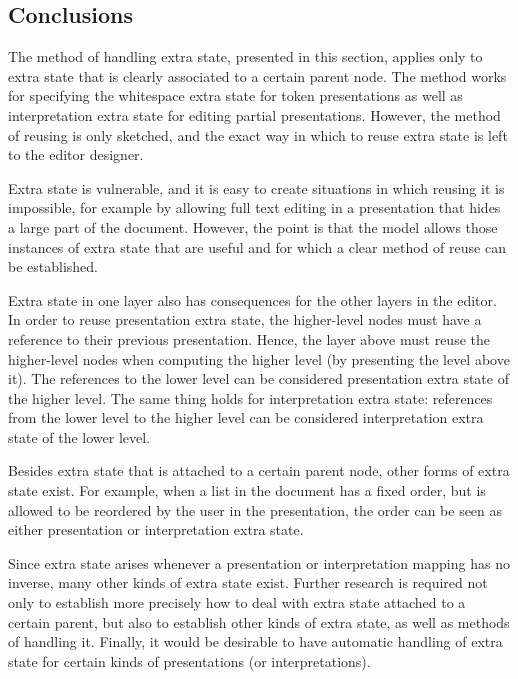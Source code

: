 \subsection{Conclusions}

The method of handling extra state, presented in this section, applies only to extra state that is clearly associated to a certain parent node. The method works for specifying the whitespace extra state for token presentations as well as interpretation extra state for editing partial presentations. However, the method of reusing is only sketched, and the exact way in which to reuse extra state is left to the editor designer.

Extra state is vulnerable, and it is easy to create situations in which reusing it is impossible, for example by allowing full text editing in a presentation that hides a large part of the document. However, the point is that the model allows those instances of extra state that are useful and for which a clear method of reuse can be established.

Extra state in one layer also has consequences for the other layers in the editor. In order to reuse presentation extra state, the higher-level nodes must have a reference to their previous presentation. Hence, the layer above must reuse the higher-level nodes when computing the higher level (by presenting the level above it). The references to the lower level can be considered presentation extra state of the higher level. The same thing holds for interpretation extra state: references from the lower level to the higher level can be considered interpretation extra state of the lower level.

Besides extra state that is attached to a certain parent node, other forms of extra state exist. For example, when a list in the document has a fixed order, but is allowed to be reordered by the user in the presentation, the order can be seen as either presentation or interpretation extra state.


Since extra state arises whenever a presentation or interpretation mapping has no inverse, many other kinds of extra state exist.
Further research is required not only to establish more precisely how to deal with extra state attached to a certain parent, but also to establish other kinds of extra state, as well as methods of handling it. Finally, it would be desirable to have automatic handling of extra state for certain kinds of presentations (or interpretations).



